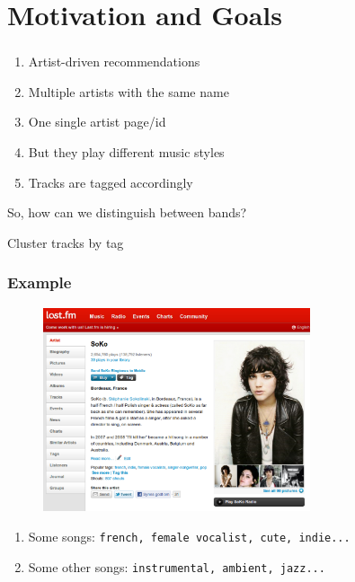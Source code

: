 \documentclass[slidestop,compress,mathserif,serif,notes=show]{beamer}
\title{\docTitle}
\begin{document}
  


  \section{Motivation and Goals}
  \begin{frame}
    \frametitle{\secname}
    \vspace*{0.5cm}
    \begin{enumerate}
      \item{}
      Artist-driven recommendations
      \item{}
      Multiple artists with the same name
      \item{}
      One single artist page/id
      \item{}
      But they play different music styles
      \item{}
      Tracks are tagged accordingly
    \end{enumerate}

    \bigskip
    So, how can we distinguish between bands?\\
    \pause
    \medskip
    \begin{center}
    \large{Cluster tracks by tag}
    \end{center}
  \end{frame}

  \begin{frame}
    \frametitle{Example}
    \vspace*{0.5cm}
    \begin{figure}
      \centering 
      \includegraphics[width=0.7\textwidth]{figs/soko.pdf} 
      \label{fig:soko} 
    \end{figure}
    \begin{enumerate}
      \item{}
      Some songs: \texttt{french, female vocalist, cute, indie...}
      \item{}
      Some other songs: \texttt{instrumental, ambient, jazz...}
    \end{enumerate}
  \end{frame}
\end{document}
